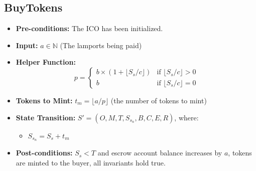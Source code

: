 \documentclass{article}
\begin{document}
\subsection{BuyTokens}
\begin{itemize}
    \item \textbf{Pre-conditions:} The ICO has been initialized.
        \item  \textbf{Input:} $a \in \mathbb{N}$ (The lamports being paid)

        \item  \textbf{Helper Function:}
        $$
        p =
        \begin{cases}
            b \times (1 + \lfloor S_s / c\rfloor)
            & \text{if }  \lfloor S_s / c\rfloor > 0
            \\
             b & \text{if }  \lfloor S_s / c\rfloor = 0
        \end{cases}
        $$
    \item  \textbf{Tokens to Mint:} $t_m = \lfloor a / p \rfloor $ (the number of tokens to mint)
     \item \textbf{State Transition:}
            $S' = (O, M, T, S_{s_n}, B, C, E, R)$, where:
            \begin{itemize}
                 \item $S_{s_n} = S_s + t_m $
            \end{itemize}
    \item \textbf{Post-conditions:} $S_s < T$ and escrow account balance increases by $a$, tokens are minted to the buyer, all invariants hold true.
\end{itemize}
\end{document}
